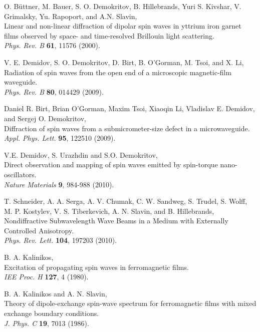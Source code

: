 \documentclass{article}
\begin{document}
\begin{thebibliography}{99}

O. B\"uttner, M. Bauer, S. O. Demokritov, B. Hillebrands, Yuri S. Kivshar, V. Grimalsky, Yu. Rapoport, and A.N. Slavin, \\
Linear and non-linear diffraction of dipolar spin waves in yttrium iron garnet films observed by space- and time-resolved Brillouin light scattering.\\
{\it Phys. Rev. B} {\bf 61}, 11576 (2000).

V. E. Demidov, S. O. Demokritov, D. Birt, B. O'Gorman, M. Tsoi, and X. Li,\\
Radiation of spin waves from the open end of a microscopic magnetic-film waveguide.\\
{\it Phys. Rev. B} {\bf 80}, 014429 (2009).

Daniel R. Birt, Brian O'Gorman, Maxim Tsoi, Xiaoqin Li, Vladislav E. Demidov, and Sergej O. Demokritov,\\
Diffraction of spin waves from a submicrometer-size defect in a microwaveguide.\\
{\it Appl. Phys. Lett.} {\bf 95}, 122510 (2009).

V.E. Demidov, S. Urazhdin and S.O. Demokritov,\\
Direct observation and mapping of spin waves emitted by spin-torque nano-oscillators.\\
{\it Nature Materials} {\bf 9}, 984-988 (2010).

T. Schneider, A. A. Serga, A. V. Chumak, C. W. Sandweg, S. Trudel, S. Wolff, M. P. Kostylev, V. S. Tiberkevich, A. N. Slavin, and B. Hillebrands,\\
Nondiffractive Subwavelength Wave Beams in a Medium with Externally Controlled Anisotropy.\\
{\it Phys. Rev. Lett.} {\bf 104}, 197203 (2010).

B. A. Kalinikos,\\
Excitation of propagating spin waves in ferromagnetic films.\\
{\it IEE Proc. H} {\bf 127}, 4 (1980).

B. A. Kalinikos and A. N. Slavin,\\
Theory of dipole-exchange spin-wave spectrum for ferromagnetic films with mixed exchange boundary conditions.\\ 
{\it J. Phys. C} {\bf 19}, 7013 (1986).

\end{thebibliography}
%
%
%
%
%
\appendix
\end{document}
